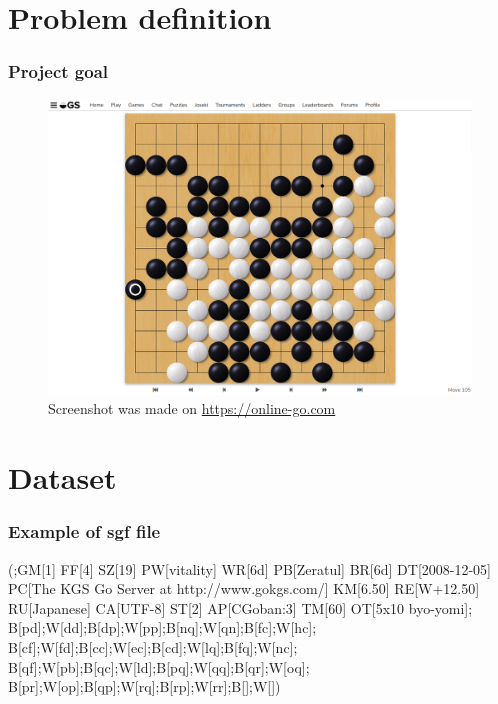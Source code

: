 \documentclass{beamer}
\begin{document}
\section{Problem definition}
\begin{frame}
\frametitle{Project goal}

\begin{figure}
	\centering
	\includegraphics[scale=0.28]{images/problem_def}
	\caption*{Screenshot was made on \url{https://online-go.com}}
\end{figure}

\end{frame}


\section{Dataset}
\begin{frame}[fragile]
\frametitle{Example of sgf file}

\begin{semiverbatim}
(;GM[1] FF[4] SZ[19] PW[vitality] WR[6d]
PB[Zeratul] BR[6d] DT[2008-12-05] 
PC[The KGS Go Server at http://www.gokgs.com/]
KM[6.50] RE[W+12.50] RU[Japanese] CA[UTF-8] ST[2] 
AP[CGoban:3] TM[60] OT[5x10 byo-yomi];
B[pd];W[dd];B[dp];W[pp];B[nq];W[qn];B[fc];W[hc];
B[cf];W[fd];B[cc];W[ec];B[cd];W[lq];B[fq];W[nc];
B[qf];W[pb];B[qc];W[ld];B[pq];W[qq];B[qr];W[oq];
B[pr];W[op];B[qp];W[rq];B[rp];W[rr];B[];W[])
\end{semiverbatim}

\end{frame}
\end{document}

